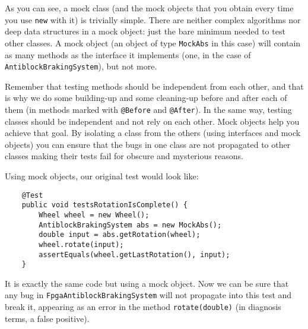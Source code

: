 As you can see, a mock class (and the mock objects that you obtain
every time you use \verb+new+ with it) is trivially simple. There are
neither complex algorithms nor deep data structures in a mock object:
just the bare minimum needed to test other classes. A mock object (an
object of type \verb+MockAbs+ in this case) will
contain as many methods as the interface it implements
(one, in the case of \verb+AntiblockBrakingSystem+), but not more. 

Remember that testing methods should be independent from each other,
and that is why we do some building-up and some cleaning-up before and
after each of them (in methods marked with \verb+@Before+ and
\verb+@After+). In the same way, testing classes should be independent
and not rely on each other. Mock objects help you achieve that goal. 
By isolating a class from the others (using interfaces and mock
objects) you can ensure that the bugs in one class are not propagated
to other classes making their tests fail for obscure and mysterious
reasons. 

Using mock objects, our original test would look like: 

\begin{verbatim}
    @Test
    public void testsRotationIsComplete() {
        Wheel wheel = new Wheel();
        AntiblockBrakingSystem abs = new MockAbs();
        double input = abs.getRotation(wheel);
        wheel.rotate(input);
        assertEquals(wheel.getLastRotation(), input);
    }
\end{verbatim}

It is exactly the same code but using a mock object. Now we can be
sure that any bug in \verb+FpgaAntiblockBrakingSystem+ will not
propagate into this test and break it, appearing as an error in the
method \verb+rotate(double)+ (in diagnosis terms, a false positive).
